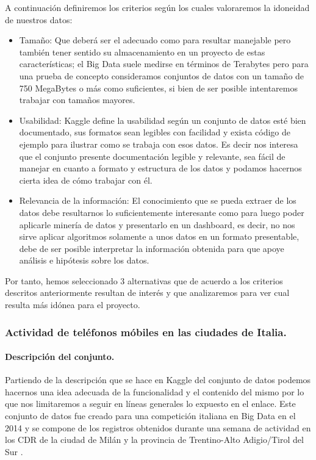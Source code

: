 \documentclass[11pt, a4paper]{article} %
\begin{document}
A continuación definiremos los criterios según los cuales valoraremos la idoneidad de nuestros datos:
\begin{itemize}
\item Tamaño: Que deberá ser el adecuado como para resultar manejable pero  también tener sentido su almacenamiento en un proyecto de estas características; el Big Data suele medirse en términos de Terabytes pero para una prueba de concepto consideramos conjuntos de datos con un tamaño de 750 MegaBytes o más como suficientes, si bien de ser posible intentaremos trabajar con tamaños mayores.
\item Usabilidad: Kaggle define la usabilidad según un conjunto de datos esté bien documentado, sus formatos sean legibles con facilidad y exista código de ejemplo para ilustrar como se trabaja con esos datos. Es decir nos interesa que el conjunto presente documentación legible y relevante, sea fácil de manejar en cuanto a formato y estructura de los datos y podamos hacernos cierta idea de cómo trabajar con él.
\item Relevancia de la información: El conocimiento que se pueda extraer de los datos debe resultarnos lo suficientemente interesante como para luego poder aplicarle minería de datos y presentarlo en un dashboard, es decir, no nos sirve aplicar algoritmos solamente a unos datos en un formato presentable, debe de ser posible interpretar la información obtenida para que apoye análisis e hipótesis sobre los datos.
\end{itemize}
Por tanto, hemos seleccionado 3 alternativas que de acuerdo a los criterios descritos anteriormente resultan de interés y que analizaremos para ver cual resulta más idónea para el proyecto.
\subsubsection{Actividad de teléfonos móbiles en las ciudades de Italia.}
\paragraph{Descripción del conjunto.}
Partiendo de la descripción que se hace en Kaggle del conjunto de datos podemos hacernos una idea adecuada de la funcionalidad y el contenido del mismo por lo que nos limitaremos a seguir en líneas generales lo expuesto en el enlace.
Este conjunto de datos fue creado para una competición italiana en Big Data en el 2014 y se compone de los registros obtenidos durante una semana de actividad en los CDR de la ciudad de Milán y la provincia de Trentino-Alto Adigio/Tirol del Sur \cite{italia}.
\end{document}
